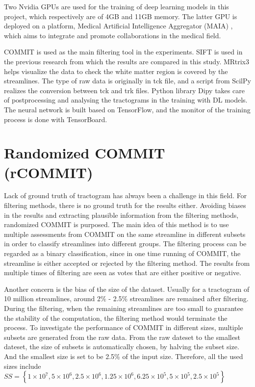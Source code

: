 Two Nvidia GPUs are used for the training of deep learning models in this project, which respectively are of 4GB and 11GB memory. 
The latter GPU is deployed on a platform, Medical Artificial Intelligence Aggregator (MAIA) \cite{MAIA}, which aims to integrate and promote collaborations in the medical field.

COMMIT \cite{daducciCOMMITConvexOptimization2015} is used as the main filtering tool in the experiments. 
SIFT \cite{smithSIFTSphericaldeconvolutionInformed2013} is used in the previous research from which the results are compared in this study.
MRtrix3 \cite{tournierMRtrix3FastFlexible2019} helps visualize the data to check the white matter region is covered by the streamlines. 
The type of raw data is originally in tck file, and a script from ScilPy realizes the conversion between tck and trk files.
Python library Dipy takes care of postprocessing and analysing the tractograms in the training with DL models.
The neural network is built based on TensorFlow, and the monitor of the training process is done with TensorBoard.

\section{Randomized COMMIT (rCOMMIT)}
Lack of ground truth of tractogram has always been a challenge in this field. For filtering methods, there is no ground truth for the results either. 
Avoiding biases in the results and extracting plausible information from the filtering methods, randomized COMMIT is purposed. 
The main idea of this method is to use multiple assessments from COMMIT on the same streamline in different subsets in order to classify streamlines into different groups.
The filtering process can be regarded as a binary classification, since in one time running of COMMIT, the streamline is either accepted or rejected by the filtering method.
The results from multiple times of filtering are seen as votes that are either positive or negative.

Another concern is the bias of the size of the dataset. Usually for a tractogram of 10 million streamlines, around 2\% - 2.5\% streamlines are remained after filtering.
During the filtering, when the remaining streamlines are too small to guarantee the stability of the computation, the filtering method would terminate the process.
To investigate the performance of COMMIT in different sizes, 
multiple subsets are generated from the raw data. From the raw dateset to the smallest dateset, the size of subsets is automatically chosen, by halving
the subset size. And the smallest size is set to be 2.5\% of the input size. Therefore, all the used sizes include $SS= \left \{  1\times 10^7, 5\times 10^6, 2.5\times 10^6, 1.25\times 10^6, 6.25\times 10^5, 5\times 10^5, 2.5\times 10^5 \right \}$ 

